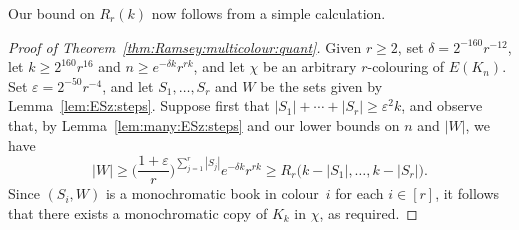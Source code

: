 \documentclass[12pt,reqno]{amsart}
\theoremstyle{definition}
\theoremstyle{remark}
\newcommand\eps{\varepsilon}
\renewcommand{\ge}{\geqslant}
\def\eps{\varepsilon}
\begin{document}
Our bound on $R_r(k)$ now follows from a simple calculation. 

\begin{proof}[Proof of Theorem~\ref{thm:Ramsey:multicolour:quant}]
Given $r \ge 2$, set $\delta = 2^{-160} r^{-12}$, let $k \ge 2^{160} r^{16}$ and $n \ge e^{-\delta k} r^{rk}$, and let $\chi$ be an arbitrary $r$-colouring of $E(K_n)$. Set $\eps = 2^{-50} r^{-4}$, and let $S_1,\ldots,S_r$ and $W$ be the sets given by Lemma~\ref{lem:ESz:steps}. Suppose first that $|S_1| + \cdots + |S_r| \ge \eps^2 k$, and observe that, by Lemma~\ref{lem:many:ESz:steps} and our lower bounds on $n$ and $|W|$, we have 
$$|W| \ge \bigg( \frac{1+\eps}{r} \bigg)^{\sum_{j = 1}^r |S_j|} e^{-\delta k} r^{rk} \ge R_r\big( k - |S_1|, \ldots, k - |S_r| \big).$$ 
Since $(S_i,W)$ is a monochromatic book in colour~$i$ for each $i \in [r]$, it follows that there exists a monochromatic copy of $K_k$ in $\chi$, as required.


\end{proof}
\end{document}

